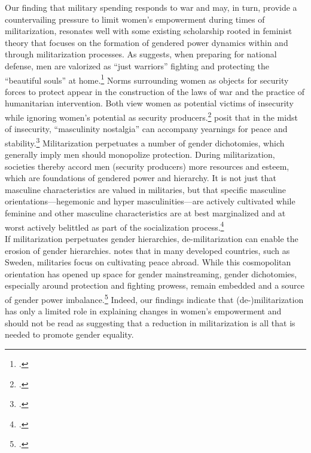 \documentclass [12pt] {article}
\begin{document}
Our finding that military spending responds to war and may, in turn, provide a countervailing pressure to limit women's empowerment during times of militarization, resonates well with some existing scholarship rooted in feminist theory that focuses on the formation of gendered power dynamics within and through militarization processes. As \citeauthor{elshtain1987women} suggests, when preparing for national defense, men are valorized as ``just warriors'' fighting and protecting the ``beautiful souls'' at home.\footnote{.} Norms surrounding women as objects for security forces to protect appear in the construction of the laws of war and the practice of humanitarian intervention. Both view women as potential victims of insecurity while ignoring women's potential as security producers.\footnote{.} \citeauthor{mackenzie:foster} posit that in the midst of insecurity, ``masculinity nostalgia'' can accompany yearnings for peace and stability.\footnote{.}  Militarization perpetuates a number of gender dichotomies, which generally imply men should monopolize protection. During militarization, societies thereby accord men (security producers) more resources and esteem, which are foundations of gendered power and hierarchy. It is not just that masculine characteristics are valued in militaries, but that specific masculine orientations---hegemonic and hyper masculinities---are actively cultivated while feminine and other masculine characteristics are at best marginalized and at worst actively belittled as part of the socialization process.\footnote{.} \\

If militarization perpetuates gender hierarchies, de-militarization can enable the erosion of gender hierarchies. \citeauthor{kronsell2012gender} notes that in many developed countries, such as Sweden, militaries focus on cultivating peace abroad. While this cosmopolitan orientation has opened up space for gender mainstreaming, gender dichotomies, especially around protection and fighting prowess, remain embedded and a source of gender power imbalance.\footnote{.} Indeed, our findings indicate that (de-)militarization has only a limited role in explaining changes in women's empowerment and should not be read as suggesting that a reduction in militarization is all that is needed to promote gender equality. \\
\end{document}
